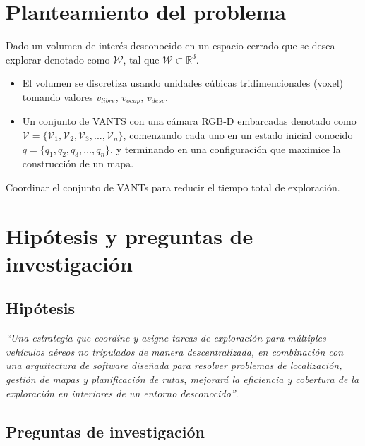 \section{Planteamiento del problema} 

Dado un volumen de interés desconocido en un espacio cerrado que se desea explorar denotado como $\mathcal{W}$, tal que $\mathcal{W} \subset \mathbb{R}^{3}$.
\begin{itemize}\setlength{\itemsep}{-1mm}
  \item El volumen se discretiza usando unidades cúbicas tridimencionales (voxel) tomando valores $v_{libre}$, $v_{ocup}$, $v_{desc}$.
  \item Un conjunto de VANTS con una cámara RGB-D embarcadas denotado como $\mathcal{V} = \{\mathcal{V}_{1},\mathcal{V}_{2},\mathcal{V}_{3},...,\mathcal{V}_{n}\}$, comenzando cada uno en un estado inicial conocido $q = \{q_{1},q_{2},q_{3},...,q_{n}\}$, y terminando en una configuración que maximice la construcción de un mapa.
\end{itemize}

Coordinar el conjunto de VANTs para reducir el tiempo total de exploración.

\section{Hipótesis y preguntas de investigación}

\subsection*{Hipótesis}
\emph{``Una estrategia que coordine y asigne tareas de exploración para múltiples vehículos aéreos no tripulados de manera descentralizada, en combinación con una arquitectura de software diseñada para resolver problemas de localización, gestión de mapas y planificación de rutas, mejorará la eficiencia y cobertura de la exploración en interiores de un entorno desconocido''}.


\subsection*{Preguntas de investigación}

